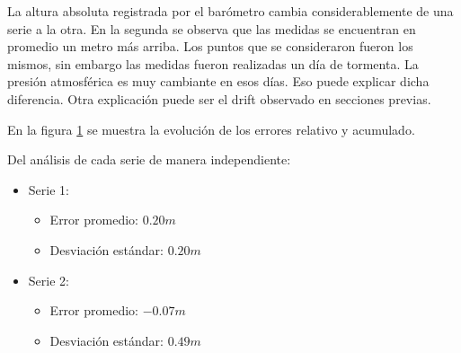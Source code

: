 \documentclass[main]{subfiles}
\begin{document}
La altura absoluta registrada por el barómetro cambia considerablemente de una serie a la otra. En la segunda se observa que las medidas se encuentran en promedio un metro más arriba. Los puntos que se consideraron fueron los mismos, sin embargo las medidas fueron realizadas un día de tormenta. La presión atmosférica es muy cambiante en esos días. Eso puede explicar dicha diferencia. Otra explicación puede ser el drift observado en secciones previas.

En la figura \ref{fig:1-metro-err} se muestra la evolución de los errores relativo y acumulado.

\begin{figure}
\vspace{-10pt}

  \caption{}
\label{fig:1-metro-err}
\vspace{-110pt}
\end{figure}

Del análisis de cada serie de manera independiente:
\begin{itemize}
\item Serie 1:
		\begin{itemize}
		\item Error promedio: $0.20m$
		\item Desviación estándar: $0.20m$
		\end{itemize}
\item Serie 2:
		\begin{itemize}
		\item Error promedio: $-0.07m$
		\item Desviación estándar: $0.49m$
		\end{itemize}
\end{itemize}
\end{document}
